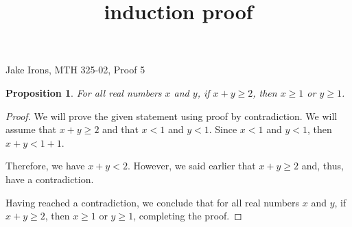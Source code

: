\documentclass[11 pt]{article}
\title{induction proof}
\newtheorem{proposition}{Proposition}
\newcommand{\newpar}{\vspace{.15in}\noindent}
\begin{document}
\noindent Jake Irons, MTH 325-02, Proof 5

\newpar
\begin{proposition}
For all real numbers $x$ and $y$, if $x+y\ge2$, then $x\ge1$ or $y\ge1$.
\end{proposition}
\begin{proof}
We will prove the given statement using proof by contradiction. We will assume that $x+y\ge2$ and that $x<1$ and $y<1$. Since $x<1$ and $y<1$, then $x+y<1+1$.

\newpar
Therefore, we have $x+y<2$. However, we said earlier that $x+y\ge2$ and, thus, have a contradiction.

\newpar
Having reached a contradiction, we conclude that for all real numbers $x$ and $y$, if $x+y\ge2$, then $x\ge1$ or $y\ge1$, completing the proof.
\end{proof}
\end{document}
